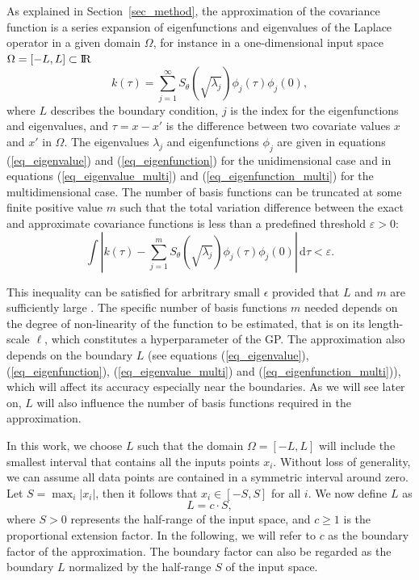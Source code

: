As explained in Section~\ref{sec_method}, the approximation of the covariance function is a series expansion of eigenfunctions and eigenvalues of the Laplace operator in a given domain $\Omega$, for instance in a one-dimensional input space $\Omega=[-L,L]\subset {\rm I\!R}$
%
\begin{equation*}
k(\tau) = \sum_{j=1}^{\infty} S_{\theta}(\sqrt{\lambda_j}) \phi_j(\tau) \phi_j(0), 
\end{equation*}
%
where $L$ describes the boundary condition, $j$ is the index for the eigenfunctions and eigenvalues, and $\tau=x-x'$ is the difference between two covariate values $x$ and $x'$ in $\Omega$. The eigenvalues $\lambda_j$ and eigenfunctions $\phi_j$ are given in equations (\ref{eq_eigenvalue}) and (\ref{eq_eigenfunction}) for the unidimensional case and in equations (\ref{eq_eigenvalue_multi}) and (\ref{eq_eigenfunction_multi}) for the multidimensional case. The number of basis functions can be truncated at some finite positive value $m$ such that the total variation difference between the exact and approximate covariance functions is less than a predefined threshold $\varepsilon > 0$:
%
\begin{equation}\label{eq_diff_covs}
 \int | k(\tau) - \sum_{j=1}^m S_{\theta}(\sqrt{\lambda_j}) \phi_j(\tau) \phi_j(0)|  \,\mathrm{d}\tau  < \varepsilon.
\end{equation}

This inequality can be satisfied for arbritrary small $\epsilon$ provided that $L$ and $m$ are sufficiently large \cite[Theorem 1 and 4]{solin2018hilbert}. 
The specific number of basis functions $m$ needed depends on the degree of non-linearity of the function to be estimated, that is on its length-scale $\ell$, which constitutes a hyperparameter of the GP. The approximation also depends on the boundary $L$ (see equations (\ref{eq_eigenvalue}), (\ref{eq_eigenfunction}), (\ref{eq_eigenvalue_multi}) and (\ref{eq_eigenfunction_multi})), which will affect its accuracy especially near the boundaries. As we will see later on, $L$ will also influence the number of basis functions required in the approximation.

In this work, we choose $L$ such that the domain $\Omega = \left[-L, L\right]$ will include the smallest interval that contains all the inputs points $x_i$. Without loss of generality, we can assume all data points are contained in a symmetric interval around zero. Let $S = \max_{i}|x_i|$, then it follows that $x_i \in \left[-S, S\right]$ for all $i$. We now define $L$ as
\begin{equation}\label{eq_boundary}
L=c \cdot S,
\end{equation} 
%
where $S > 0$ represents the half-range of the input space, and $c \geq 1$ is the proportional extension factor. In the following, we will refer to $c$ as the boundary factor of the approximation. The boundary factor can also be regarded as the boundary $L$ normalized by the half-range $S$ of the input space.

